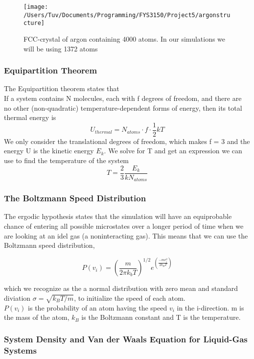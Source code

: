 \documentclass[a4paper, 12pt]{article}
\begin{document}
\begin{figure}
\centering
\texttt{[image: /Users/Tuv/Documents/Programming/FYS3150/Project5/argonstructure]}
\caption{FCC-crystal of argon containing 4000 atoms. In our simulations we will be using 1372 atoms}
\end{figure}
\subsubsection{Equipartition Theorem}
The Equipartition theorem\cite{Equipartition} states that\\
If a system contains N molecules, each with f degrees of freedom, and there are no other (non-quadratic) temperature-dependent forms of energy, then its total thermal energy is
\begin{equation}
U_{thermal} = N_{atoms} \cdot f \cdot \frac{1}{2} kT
\end{equation}
We only consider the translational degrees of freedom, which makes f = 3 and the energy U is the kinetic energy $E_k$. We solve for T and get an expression we can use to find the temperature of the system
\begin{equation}
T = \frac{2}{3}\frac{E_k}{kN_{atoms}}
\end{equation}
\subsubsection{The Boltzmann Speed Distribution}
The ergodic hypothesis states that the simulation will have an equiprobable chance of entering all possible microstates over a longer period of time when we are looking at an idel gas (a noninteracting gas). This means that we can use the Boltzmann speed distribution, 

$$P(v_i ) = \left (\frac{m}{2\pi k_b T}\right )^{1/2} e^{\left ( \frac{-mv_i^2}{2k_B T}\right )}$$

which we recognize as the a normal distribution with zero mean and standard diviation $\sigma = \sqrt{k_B T/m}$,  to initialize the speed of each atom.\\
 $P(v_i )$ is the probability of an atom having the speed $v_i$ in the i-direction. m is the mass of the atom, $k_B$ is the Boltzmann constant and T is the temperature.
\subsubsection{System Density and Van der Waals Equation for Liquid-Gas Systems}
\end{document}
